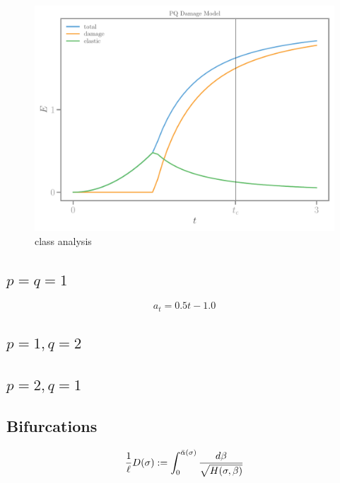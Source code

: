 \documentclass[]{article}
\begin{document}
\begin{figure}[htbp]
  \includegraphics[width=.33\textheight]{../figures/pq-energies-homog.pdf}
  \caption{class analysis}
  \label{fig:class-analyser}
\end{figure}


\subsection*{$p=q=1$}

$$
a_t = 0.5 t - 1.0
$$
\subsection*{$p=1, q=2$}
\subsection*{$p=2, q=1$}




\subsection*{Bifurcations}
$$
\frac{1}{\ell}D(\sigma) := \int_0^{\bar \alpha(\sigma)} \frac{d \beta}{\sqrt{H(\sigma, \beta)}}
$$
\end{document}
